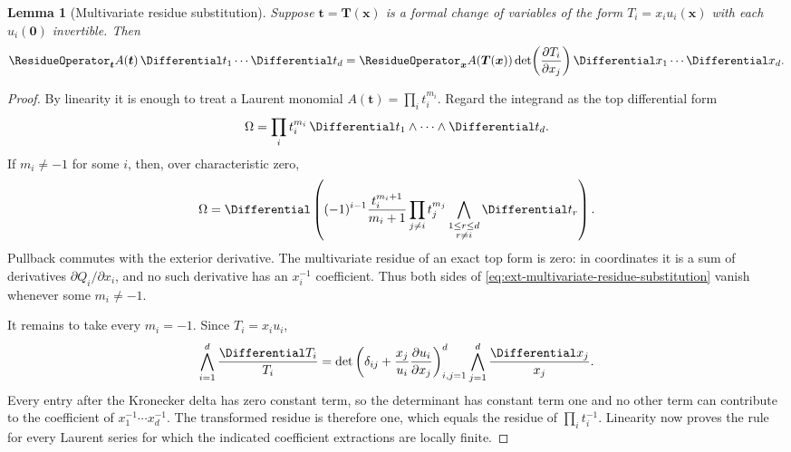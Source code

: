 \documentclass[11pt,a4paper,oneside,openany]{book}
\newtheorem{lemma}[theorem]{Lemma}
\theoremstyle{definition}
\theoremstyle{remark}
\begin{document}
\begin{lemma}[Multivariate residue substitution]
\label{lem:ext-multivariate-residue-substitution}
Suppose \(\boldsymbol t=\boldsymbol T(\boldsymbol x)\) is a formal change of
variables of the form
\(T_i=x_i u_i(\boldsymbol x)\) with each \(u_i(\boldsymbol0)\) invertible.
Then
\begin{equation}\label{eq:ext-multivariate-residue-substitution}
 \ResidueOperator_{\boldsymbol t} A(\boldsymbol t)\,
   \Differential t_1\cdots\Differential t_d
 =\ResidueOperator_{\boldsymbol x} A(\boldsymbol T(\boldsymbol x))
   \det\!\left(\frac{\partial T_i}{\partial x_j}\right)
   \Differential x_1\cdots\Differential x_d.
\end{equation}
\end{lemma}
\begin{proof}
By linearity it is enough to treat a Laurent monomial
\(A(\boldsymbol t)=\prod_i t_i^{m_i}\).  Regard the integrand as the top
differential form
\[
 \Omega=\prod_i t_i^{m_i}\,\Differential t_1\wedge\cdots\wedge\Differential t_d.
\]
If \(m_i\ne-1\) for some \(i\), then, over characteristic zero,
\[
 \Omega=\Differential\left(
 (-1)^{i-1}\frac{t_i^{m_i+1}}{m_i+1}
 \prod_{j\ne i}t_j^{m_j}
 \bigwedge_{\substack{1\le r\le d\\ r\ne i}}\Differential t_r
 \right).
\]
Pullback commutes with the exterior derivative.  The multivariate residue of
an exact top form is zero: in coordinates it is a sum of derivatives
\(\partial Q_i/\partial x_i\), and no such derivative has an
\(x_i^{-1}\) coefficient.  Thus both sides of
\eqref{eq:ext-multivariate-residue-substitution} vanish whenever some
\(m_i\ne-1\).

It remains to take every \(m_i=-1\).  Since \(T_i=x_i u_i\),
\[
 \bigwedge_{i=1}^d\frac{\Differential T_i}{T_i}
 =\det\left(
 \delta_{ij}+\frac{x_j}{u_i}\frac{\partial u_i}{\partial x_j}
 \right)_{i,j=1}^d
 \bigwedge_{j=1}^d\frac{\Differential x_j}{x_j}.
\]
Every entry after the Kronecker delta has zero constant term, so the determinant
has constant term one and no other term can contribute to the coefficient of
\(x_1^{-1}\cdots x_d^{-1}\).  The transformed residue is therefore one,
which equals the residue of \(\prod_i t_i^{-1}\).  Linearity now proves the
rule for every Laurent series for which the indicated coefficient extractions
are locally finite.
\end{proof}
\end{document}

